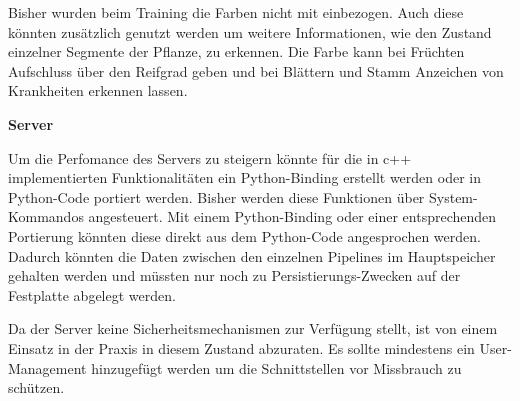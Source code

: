 \documentclass[12pt,titlepage, twoside]{article}
\begin{document}
Bisher wurden beim Training die Farben nicht mit einbezogen. Auch diese könnten zusätzlich genutzt werden um weitere Informationen, wie den Zustand einzelner Segmente der Pflanze, zu erkennen. 
Die Farbe kann bei Früchten Aufschluss über den Reifgrad geben und bei Blättern und Stamm Anzeichen von Krankheiten erkennen lassen.



\textbf{Server}

Um die Perfomance des Servers zu steigern könnte für die in c++ implementierten Funktionalitäten ein Python-Binding erstellt werden oder in Python-Code portiert werden. Bisher werden diese Funktionen über System-Kommandos angesteuert. 
Mit einem Python-Binding oder einer entsprechenden Portierung könnten diese direkt aus dem Python-Code angesprochen werden. 
Dadurch könnten die Daten zwischen den einzelnen Pipelines im Hauptspeicher gehalten werden und müssten nur noch zu Persistierungs-Zwecken auf der Festplatte abgelegt werden.

Da der Server keine Sicherheitsmechanismen zur Verfügung stellt, ist von einem Einsatz in der Praxis in diesem Zustand abzuraten. Es sollte mindestens ein User-Management hinzugefügt werden um die Schnittstellen vor Missbrauch zu schützen.


\newpage



\end{document}
